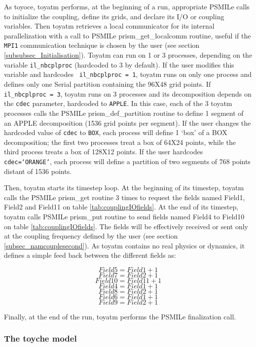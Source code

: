 As toyoce, toyatm performs, at the beginning of a run, appropriate
PSMILe calls to initialize the coupling, define its grids, and declare
its I/O or coupling variables. Then toyatm retrieves a local
communicator for its internal parallelization with a call to PSMILe
prism\_get\_localcomm routine, useful if the {\tt MPI1} communication
technique is chosen by the user (see section
\ref{subsubsec_Initialisation}). Toyatm can run on 1 or 3 processes,
depending on the variable {\tt il\_nbcplproc} (hardcoded to 3 by
default). If the user modifies this variable and hardcodes {\tt
  il\_nbcplproc = 1}, toyatm runs on only one process and defines only
one Serial partition containing the 96X48 grid points. If {\tt
  il\_nbcplproc = 3}, toyatm runs on 3 processes and its decomposition
depends on the {\tt cdec} parameter, hardcoded to {\tt APPLE}. In this
case, each of the 3 toyatm processes calls the PSMILe
prism\_def\_partition routine to define 1 segment of an APPLE
decomposition (1536 grid points per segment). If the user changes the
hardcoded value of {\tt cdec} to {\tt BOX}, each process will define 1
`box' of a BOX decomposition; the first two processes treat a box of
64X24 points, while the third process treats a box of 128X12 points.
If the user hardcodes {\tt cdec=`ORANGE`}, each process will define a
partition of two segments of 768 points distant of 1536 points.

Then, toyatm starts its timestep loop. At the beginning of its timestep,
toyatm calls the PSMILe prism\_get routine 3 times to request the fields
named Field1, Field2 and Field11 on table
\ref{tab:couplingIOfields}. At the end of its timestep, toyatm calls
PSMILe prism\_put routine to send  fields named Field4 to Field10 on
table \ref{tab:couplingIOfields}. The fields will be effectively
received or sent only at the coupling frequency defined by the user
(see section \ref{subsec_namcouplesecond}). As toyatm contains no real physics
or dynamics, it defines a simple feed back between the different
fields as:

$$ Field5 = Field1 + 1  $$
$$ Field7 = Field2 + 1 $$
$$ Field10 = Field11 + 1 $$
$$ Field4 = Field1 + 1 $$
$$ Field8 = Field2 + 1 $$
$$ Field6 = Field1 + 1 $$
$$ Field9 = Field2 + 1 $$

Finally, at the end of the run, toyatm performs the PSMILe finalization call.

\subsubsection{The toyche model}
\label{sec:toyche} 


